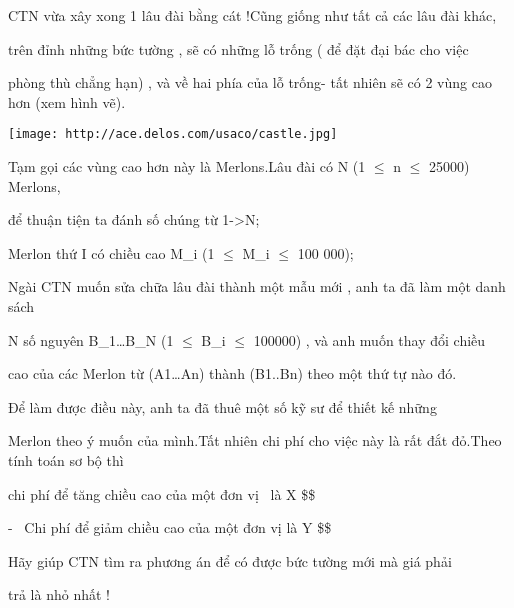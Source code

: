 CTN vừa xây xong 1 lâu đài bằng cát !Cũng giống như tất cả các lâu đài khác,  

   trên đỉnh những bức tường , sẽ có những lỗ trống ( để đặt đại bác cho việc  

   phòng thù chẳng hạn) , và về hai phía của lỗ trống- tất nhiên sẽ có 2 vùng cao hơn (xem hình vẽ).  


\texttt{[image: http://ace.delos.com/usaco/castle.jpg]}

   Tạm gọi các vùng cao hơn này là Merlons.Lâu đài có N (1 $\le$ n $\le$ 25000) Merlons,  

   để thuận tiện ta đánh số chúng từ 1->N;  

   Merlon thứ I có chiều cao M\_i (1 $\le$ M\_i $\le$ 100 000);  

   Ngài CTN muốn sửa chữa lâu đài thành một mẫu mới , anh ta đã làm một danh sách  

   N số nguyên B\_1…B\_N (1 $\le$ B\_i $\le$ 100000) , và anh muốn thay đổi chiều  

   cao của các Merlon từ (A1…An) thành (B1..Bn) theo một thứ tự nào đó.  



   Để làm được điều này, anh ta đã thuê một số kỹ sư để thiết kế những  

   Merlon theo ý muốn của mình.Tất nhiên chi phí cho việc này là rất đắt đỏ.Theo tính toán sơ bộ thì  

   chi phí để tăng chiều cao của một đơn vị  là X \$\$  

   -  Chi phí để giảm chiều cao của một đơn vị là Y \$\$  

   Hãy giúp CTN tìm ra phương án để có được bức tường mới mà giá phải  

   trả là nhỏ nhất !